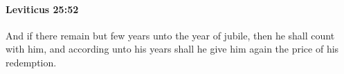 
		\paragraph{Leviticus 25:52} %
			\label{LEVITICUS-25-52}

			And if there remain but few years unto the year of jubile, then he shall count with him, and according unto his years shall he give him again the price of his redemption.


